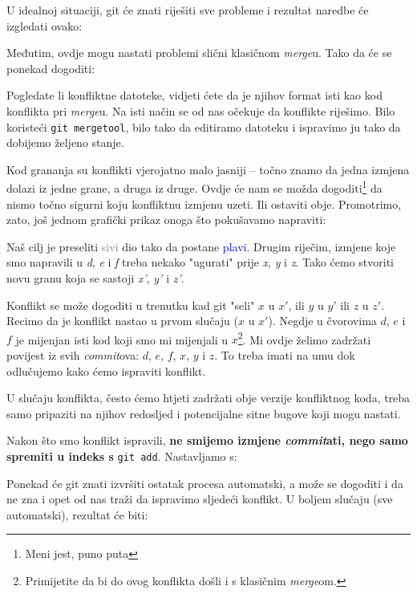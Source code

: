 U idealnoj situaciji, git će znati riješiti sve probleme i rezultat naredbe će izgledati ovako:



Međutim, ovdje mogu nastati problemi slični klasičnom \emph{merge}u.
Tako da će se ponekad dogoditi:



Pogledate li konfliktne datoteke, vidjeti ćete da je njihov format isti kao kod konflikta pri \emph{merge}u.
Na isti način se od nas očekuje da konflikte riješimo.
Bilo koristeći \verb+git mergetool+, bilo tako da editiramo datoteku i ispravimo ju tako da dobijemo željeno stanje.

Kod grananja su konflikti vjerojatno malo jasniji -- točno znamo da jedna izmjena dolazi iz jedne grane, a druga iz druge.
Ovdje će nam se možda dogoditi\footnote{Meni jest, puno puta} da nismo točno sigurni koju konfliktnu izmjenu uzeti.
Ili ostaviti obje.
Promotrimo, zato, još jednom grafički prikaz onoga što pokušavamo napraviti:



Naš cilj je preseliti \textcolor{gray}{sivi} dio tako da postane \textcolor{blue}{plavi}.
Drugim riječim, izmjene koje smo napravili u \emph d, \emph e i \emph f treba nekako "ugurati" prije \emph x, \emph y i \emph z.
Tako ćemo stvoriti novu granu koja se sastoji \emph{x'}, \emph{y'} i \emph{z'}.

Konflikt se može dogoditi u trenutku kad git "seli" $x$ u $x'$, ili $y$ u $y'$ ili $z$ u $z'$.
Recimo da je konflikt nastao u prvom slučaju ($x$ u $x'$).
Negdje u čvorovima $d$, $e$ i $f$ je mijenjan isti kod koji smo mi mijenjali u $x$\footnote{Primijetite da bi do ovog konflikta došli i s klasičnim \emph{merge}om.}.
Mi ovdje želimo zadržati povijest iz svih \emph{commit}ova: $d$, $e$, $f$, $x$, $y$ i $z$.
To treba imati na umu dok odlučujemo kako ćemo ispraviti konflikt.

U slučaju konflikta, često ćemo htjeti zadržati obje verzije konfliktnog koda, treba samo pripaziti na njihov redosljed i potencijalne sitne bugove koji mogu nastati.

Nakon što smo konflikt ispravili, \textbf{ne smijemo izmjene \emph{commit}ati, nego samo spremiti u indeks s} \verb+git add+.
Nastavljamo s:


Ponekad će git znati izvršiti ostatak procesa automatski, a može se dogoditi i da ne zna i opet od nas traži da ispravimo sljedeći konflikt.
U boljem slučaju (sve automatski), rezultat će biti:

